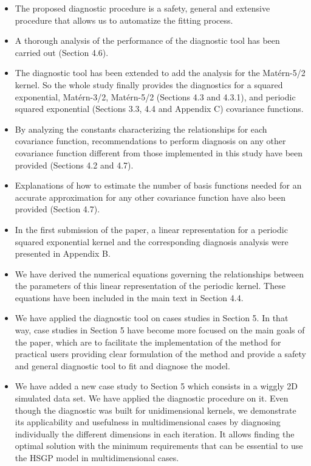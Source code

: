 \documentclass[11pt]{report}
\begin{document}
\begin{itemize}
\item The proposed diagnostic procedure is a safety, general and extensive procedure that allows us to automatize the fitting process.

\item A thorough analysis of the performance of the diagnostic tool has been carried out (Section 4.6).

\item The diagnostic tool has been extended to add the analysis for the Mat\'ern-5/2 kernel. So the whole study finally provides the diagnostics for a squared exponential, Mat\'ern-3/2, Mat\'ern-5/2 (Sections 4.3 and 4.3.1), and periodic squared exponential (Sections 3.3, 4.4 and Appendix C) covariance functions. 

\item By analyzing the constants characterizing the relationships for each covariance function, recommendations to perform diagnosis on any other covariance function different from those implemented in this study have been provided (Sections 4.2 and 4.7).

\item Explanations of how to estimate the number of basis functions needed for an accurate approximation for any other covariance function have also been provided (Section 4.7).

\item In the first submission of the paper, a linear representation for a periodic squared exponential kernel and the corresponding diagnosis analysis were presented in Appendix B. 

\item We have derived the numerical equations governing the relationships between the parameters of this linear representation of the periodic kernel. These equations have been included in the main text in Section 4.4.

\item We have applied the diagnostic tool on cases studies in Section 5. In that way, case studies in Section 5 have become more focused on the main goals of the paper, which are to facilitate the implementation of the method for practical users providing clear formulation of the method and provide a safety and general diagnostic tool to fit and diagnose the model.

\item We have added a new case study to Section 5 which consists in a wiggly 2D simulated data set. We have applied the diagnostic procedure on it. Even though the diagnostic was built for unidimensional kernels, we demonstrate its applicability and usefulness in multidimensional cases by diagnosing individually the different dimensions in each iteration. It allows finding the  optimal solution with the minimum requirements that can be essential to use the HSGP model in multidimensional cases.


\end{itemize}
\end{document}
